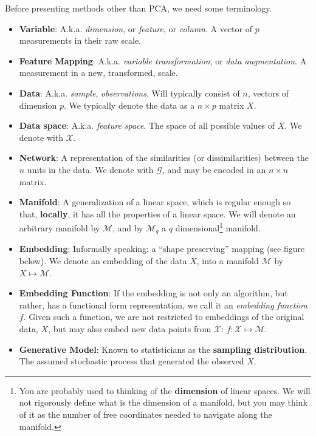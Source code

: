 \documentclass[]{book}
\theoremstyle{definition}
\theoremstyle{definition}
\theoremstyle{definition}
\theoremstyle{remark}
\begin{document}
Before presenting methods other than PCA, we need some terminology.

\begin{itemize}
\item
  \textbf{Variable}: A.k.a. \emph{dimension}, or \emph{feature}, or
  \emph{column}. A vector of \(p\) measurements in their raw scale.
\item
  \textbf{Feature Mapping}: A.k.a. \emph{variable transformation}, or
  \emph{data augmentation}. A measurement in a new, transformed, scale.
\item
  \textbf{Data}: A.k.a. \emph{sample}, \emph{observations}. Will
  typically consist of \(n\), vectors of dimension \(p\). We typically
  denote the data as a \(n\times p\) matrix \(X\).
\item
  \textbf{Data space}: A.k.a. \emph{feature space}. The space of all
  possible values of \(X\). We denote with \(\mathcal{X}\).
\item
  \textbf{Network}: A representation of the similarities (or
  dissimilarities) between the \(n\) units in the data. We denote with
  \(\mathcal{G}\), and may be encoded in an \(n \times n\) matrix.
\item
  \textbf{Manifold}: A generalization of a linear space, which is
  regular enough so that, \textbf{locally}, it has all the properties of
  a linear space. We will denote an arbitrary manifold by
  \(\mathcal{M}\), and by \(\mathcal{M}_q\) a \(q\)
  dimensional\footnote{You are probably used to thinking of the
    \textbf{dimension} of linear spaces. We will not rigorously define
    what is the dimension of a manifold, but you may think of it as the
    number of free coordinates needed to navigate along the manifold.}
  manifold.
\item
  \textbf{Embedding}: Informally speaking: a ``shape preserving''
  mapping (see figure below). We denote an embedding of the data \(X\),
  into a manifold \(\mathcal{M}\) by \(X\mapsto \mathcal{M}\).
\item
  \textbf{Embedding Function}: If the embedding is not only an
  algorithm, but rather, has a functional form representation, we call
  it an \emph{embedding function} \(f\). Given such a function, we are
  not restricted to embeddings of the original data, \(X\), but may also
  embed new data points from \(\mathcal{X}\):
  \(f:\mathcal{X}\mapsto\mathcal{M}\).
\item
  \textbf{Generative Model}: Known to statisticians as the
  \textbf{sampling distribution}. The assumed stochastic process that
  generated the observed \(X\).
\end{itemize}
\end{document}

